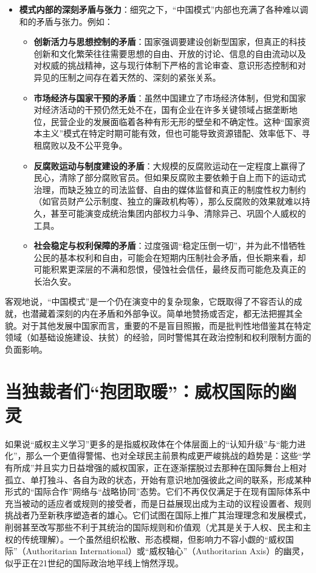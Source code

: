 \documentclass[UTF8, 10pt]{ctexbook}
\begin{document}
\begin{itemize}
    \item \textbf{模式内部的深刻矛盾与张力}：细究之下，“中国模式”内部也充满了各种难以调和的矛盾与张力。例如：
        \begin{itemize}
            \item \textbf{创新活力与思想控制的矛盾}：国家强调要建设创新型国家，但真正的科技创新和文化繁荣往往需要思想的自由、开放的讨论、信息的自由流动以及对权威的挑战精神，这与现行体制下严格的言论审查、意识形态控制和对异见的压制之间存在着天然的、深刻的紧张关系。
            \item \textbf{市场经济与国家干预的矛盾}：虽然中国建立了市场经济体制，但党和国家对经济活动的干预仍然无处不在，国有企业在许多关键领域占据垄断地位，民营企业的发展面临着各种有形无形的壁垒和不确定性。这种“国家资本主义”模式在特定时期可能有效，但也可能导致资源错配、效率低下、寻租腐败以及不公平竞争。
            \item \textbf{反腐败运动与制度建设的矛盾}：大规模的反腐败运动在一定程度上赢得了民心，清除了部分腐败官员。但如果反腐败主要依赖于自上而下的运动式治理，而缺乏独立的司法监督、自由的媒体监督和真正的制度性权力制约（如官员财产公示制度、独立的廉政机构等），那么反腐败的效果就难以持久，甚至可能演变成统治集团内部权力斗争、清除异己、巩固个人威权的工具。
            \item \textbf{社会稳定与权利保障的矛盾}：过度强调“稳定压倒一切”，并为此不惜牺牲公民的基本权利和自由，可能会在短期内压制社会矛盾，但长期来看，却可能积累更深层的不满和怨恨，侵蚀社会信任，最终反而可能危及真正的长治久安。
        \end{itemize}
\end{itemize}
客观地说，“中国模式”是一个仍在演变中的复杂现象，它既取得了不容否认的成就，也潜藏着深刻的内在矛盾和外部争议。简单地赞扬或否定，都无法把握其全貌。对于其他发展中国家而言，重要的不是盲目照搬，而是批判性地借鉴其在特定领域（如基础设施建设、扶贫）的经验，同时警惕其在政治控制和权利限制方面的负面影响。

\section{当独裁者们“抱团取暖”：威权国际的幽灵}
\lettrine[lines=2]{如}{果}说“威权主义学习”更多的是指威权政体在个体层面上的“认知升级”与“能力进化”，那么一个更值得警惕、也对全球民主前景构成更严峻挑战的趋势是：这些“学有所成”并且实力日益增强的威权国家，正在逐渐摆脱过去那种在国际舞台上相对孤立、单打独斗、各自为政的状态，开始有意识地加强彼此之间的联系，形成某种形式的“国际合作”网络与“战略协同”态势。它们不再仅仅满足于在现有国际体系中充当被动的适应者或规则的接受者，而是日益展现出成为主动的议程设置者、规则挑战者乃至新秩序塑造者的雄心。它们试图在国际上推广其治理理念和发展模式，削弱甚至改写那些不利于其统治的国际规则和价值观（尤其是关于人权、民主和主权的传统理解）。一个虽然组织松散、形态模糊，但影响力不容小觑的“威权国际”（Authoritarian International）或“威权轴心”（Authoritarian Axis）的幽灵，似乎正在21世纪的国际政治地平线上悄然浮现。
\end{document}
